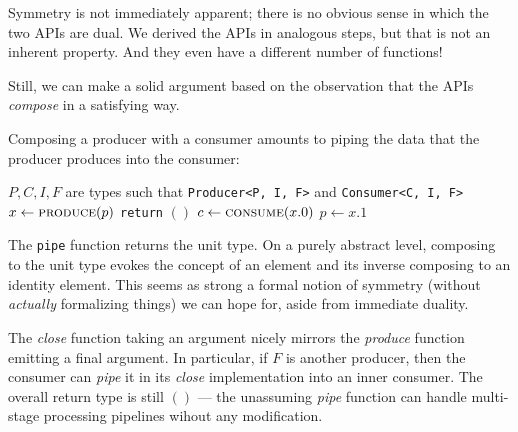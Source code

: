 \documentclass[sigplan,screen,10pt,review]{acmart}
\begin{document}
Symmetry is not immediately apparent; there is no obvious sense in which the two APIs are dual. We derived the APIs in analogous steps, but that is not an inherent property. And they even have a different number of functions!

Still, we can make a solid argument based on the observation that the APIs \textit{compose} in a satisfying way.

Composing a producer with a consumer amounts to piping the data that the producer produces into the consumer:

\begin{algorithmic}
\Require $P, C, I, F$ are types such that \texttt{Producer<P, I, F>} and \texttt{Consumer<C, I, F>}
    \Loop
        \State $x \gets \Call{produce}{p}$
            \State {}
            \State \texttt{return} $()$
        \Else
            \State $c \gets \Call{consume}{x.0}$
            \State $p \gets x.1$
        \EndIf
    \EndLoop
\EndProcedure
\end{algorithmic}


The \texttt{pipe} function returns the unit type. On a purely abstract level, composing to the unit type evokes the concept of an element and its inverse composing to an identity element. This seems as strong a formal notion of symmetry (without \textit{actually} formalizing things) we can hope for, aside from immediate duality.

The \textit{close} function taking an argument nicely mirrors the \textit{produce} function emitting a final argument. In particular, if $F$ is another producer, then the consumer can \textit{pipe} it in its \textit{close} implementation into an inner consumer. The overall return type is still $()$ --- the unassuming \textit{pipe} function can handle multi-stage processing pipelines wihout any modification.

\end{document}
